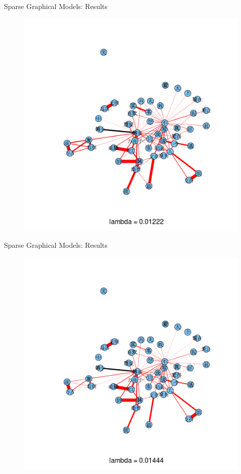 \documentclass[12pt]{beamer}
\newcommand{\1}[1]{{\mathbf 1}\left\{#1\right\}}        %
\begin{document}
\begin{frame}{Sparse Graphical Models: Results}

\begin{figure}
  \centering
  \includegraphics[height=0.9\textheight]{./../../gLassoResults/glasso2.png} 
\end{figure}

\end{frame}
\begin{frame}{Sparse Graphical Models: Results}

\begin{figure}
  \centering
  \includegraphics[height=0.9\textheight]{./../../gLassoResults/glasso3.png} 
\end{figure}

\end{frame}
\end{document}
